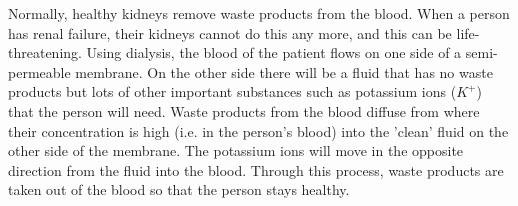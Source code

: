 \begin{IFact}
{Normally, healthy kidneys remove waste products from the blood. When a person has renal failure, their kidneys cannot do this any more, and this can be life-threatening. Using dialysis, the blood of the patient flows on one side of a semi-permeable membrane. On the other side there will be a fluid that has no waste products but lots of other important substances such as potassium ions ($K^{+}$) that the person will need. Waste products from the blood diffuse from where their concentration is high (i.e. in the person's blood) into the 'clean' fluid on the other side of the membrane. The potassium ions will move in the opposite direction from the fluid into the blood. Through this process, waste products are taken out of the blood so that the person stays healthy.}
\end{IFact}

